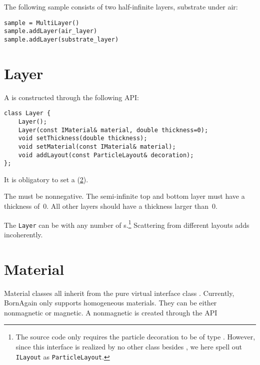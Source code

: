 The following sample consists of two half-infinite layers,
substrate under air:

\setPy
\begin{lstlisting}
sample = MultiLayer()
sample.addLayer(air_layer)
sample.addLayer(substrate_layer)
\end{lstlisting}

\section{Layer}\label{SRefLayer}

A  is constructed through the following API:

\setCpp
\begin{lstlisting}
class Layer {
    Layer();
    Layer(const IMaterial& material, double thickness=0);
    void setThickness(double thickness);
    void setMaterial(const IMaterial& material);
    void addLayout(const ParticleLayout& decoration);
};
\end{lstlisting}

It is obligatory to set a  (\cref{SRefMat}).

The  must be nonnegative.
The semi-infinite top and bottom layer must have a  thickness of~0.
All other layers should have a thickness larger than~0.

The \texttt{Layer} can be  with any number of s.\footnote
{The source code only requires the particle decoration to be of type .
However, since this interface is realized by no other class besides ,
we here spell out \texttt{ILayout} as \texttt{ParticleLayout}.}
Scattering from different layouts adds incoherently.

\section{Material}\label{SRefMat}

Material classes all inherit from the pure virtual interface class .
Currently, BornAgain only supports homogeneous materials.
They can be either nonmagnetic or magnetic.
A nonmagnetic  is created through the API

